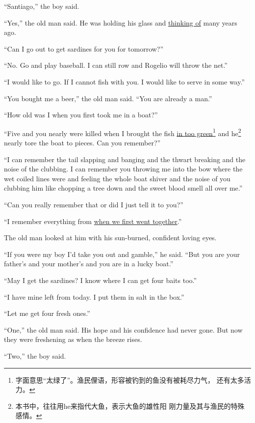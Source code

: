 ``Santiago,'' the boy said.

``Yes,'' the old man said. He was holding his glass and \uline{thinking of}
many years ago.

``Can I go out to get \glspl{sardine} for you for tomorrow?''

``No. Go and play baseball. I can \gls{still} \gls{row} and Rogelio will \gls{throw} the net.''

``I would like to go. If I cannot fish with you. I would like to \gls{serve} in some way.''

``You bought me a beer,'' the old man said. ``You are already a man.''

``How old was I when you first took me in a boat?''

``Five and you nearly were killed when I brought the fish \uline{in too
  green}\footnote{字面意思“太绿了”。渔民俚语，形容被钓到的鱼没有被耗尽力气，
  还有太多活力。} and he\footnote{本书中，往往用he来指代大鱼，表示大鱼的雄性阳
  刚力量及其与渔民的特殊感情。} nearly \gls{tore} the boat to pieces. Can
you remember?''

``I can remember the tail \gls{slapping} and \gls{banging} and the \gls{thwart}
breaking and the noise of the \gls{clubbing}. I can remember you throwing me into
the \gls{bow} where the wet coiled lines were and feeling the whole boat \gls{shiver}
and the noise of you \gls{clubbing} him like \gls{chopping} a tree down and the \gls{sweet}
blood smell all \gls{over} me.''

``Can you really remember that or did I just tell it to you?''

``I remember everything from \uline{when we first went together}.''

The old man looked at him with his sun-burned, \gls{confident} loving eyes.

``If you were my boy I'd take you out and \gls{gamble},'' he said. ``But you are your father's and your mother's and you are in a lucky boat.''

``May I get the sardines? I know where I can get four \glspl{bait} too.''

``I have mine left from today. I put them in salt in the box.''

``Let me get four fresh ones.''

``One,'' the old man said. His hope and his \gls{confidence} had never gone. But now they were \gls{freshening} as when the \gls{breeze} \glspl{rise}.

``Two,'' the boy said.

